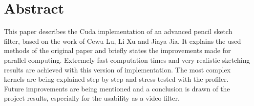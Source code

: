 \section*{Abstract} 
This paper describes the Cuda implementation of an advanced pencil sketch
filter, based on the work of Cewu Lu, Li Xu and Jiaya Jia\cite{mainPaper}.  It
explains the used methods of the original paper and briefly states the
improvements made for parallel computing.  Extremely fast computation times and
very realistic sketching results are achieved with this version of
implementation.  The most complex kernels are being explained step by step and
stress tested with the profiler.  Future improvements are being mentioned and a
conclusion is drawn of the project results, especially for the usability as a
video filter.
